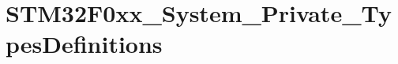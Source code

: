 \hypertarget{group___s_t_m32_f0xx___system___private___types_definitions}{}\section{S\+T\+M32\+F0xx\+\_\+\+System\+\_\+\+Private\+\_\+\+Types\+Definitions}
\label{group___s_t_m32_f0xx___system___private___types_definitions}
